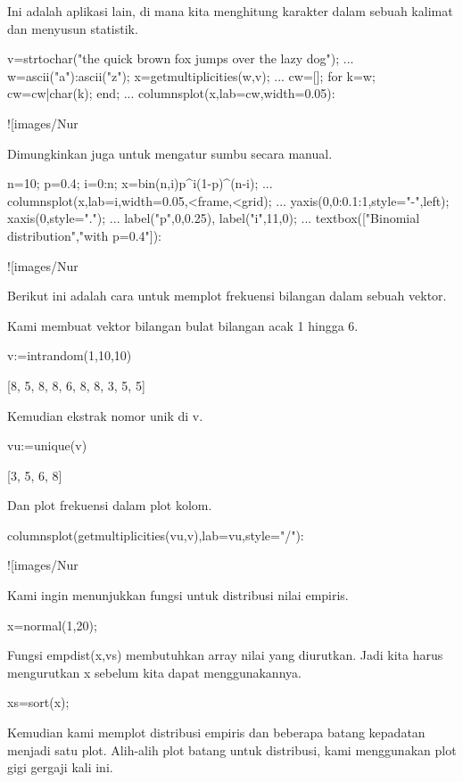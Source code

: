 \documentclass{article}
\begin{document}
Ini adalah aplikasi lain, di mana kita menghitung karakter dalam
sebuah kalimat dan menyusun statistik.


\>v=strtochar("the quick brown fox jumps over the lazy dog"); ...  
\>   w=ascii("a"):ascii("z"); x=getmultiplicities(w,v); ...  
\>   cw=[]; for k=w; cw=cw|char(k); end; ...  
\>   columnsplot(x,lab=cw,width=0.05):


![images/Nur%

Dimungkinkan juga untuk mengatur sumbu secara manual.


\>n=10; p=0.4; i=0:n; x=bin(n,i)\*p^i\*(1-p)^(n-i); ...  
\>   columnsplot(x,lab=i,width=0.05,<frame,<grid); ...  
\>   yaxis(0,0:0.1:1,style="-\>",\>left); xaxis(0,style="."); ...  
\>   label("p",0,0.25), label("i",11,0); ...  
\>   textbox(["Binomial distribution","with p=0.4"]):


![images/Nur%

Berikut ini adalah cara untuk memplot frekuensi bilangan dalam sebuah
vektor.


Kami membuat vektor bilangan bulat bilangan acak 1 hingga 6.


\>v:=intrandom(1,10,10)


    [8,  5,  8,  8,  6,  8,  8,  3,  5,  5]

Kemudian ekstrak nomor unik di v.


\>vu:=unique(v)


    [3,  5,  6,  8]

Dan plot frekuensi dalam plot kolom.


\>columnsplot(getmultiplicities(vu,v),lab=vu,style="/"):


![images/Nur%

Kami ingin menunjukkan fungsi untuk distribusi nilai empiris.


\>x=normal(1,20);


Fungsi empdist(x,vs) membutuhkan array nilai yang diurutkan. Jadi kita
harus mengurutkan x sebelum kita dapat menggunakannya.


\>xs=sort(x);


Kemudian kami memplot distribusi empiris dan beberapa batang kepadatan
menjadi satu plot. Alih-alih plot batang untuk distribusi, kami
menggunakan plot gigi gergaji kali ini.
\end{document}
